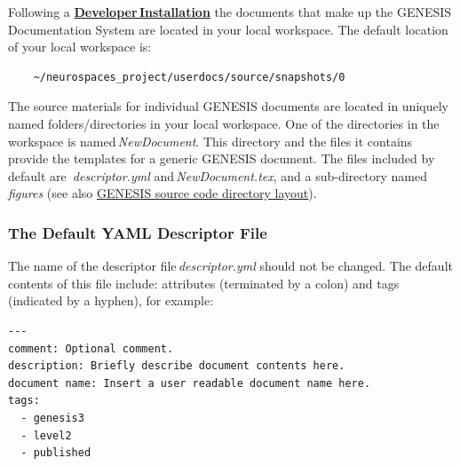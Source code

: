 \documentclass[12pt]{article}
\begin{document}
Following a \href{../genesis-installation/genesis-installation.tex}{\bf Developer\,Installation} the documents that make up the GENESIS Documentation System are located in your local workspace. The default location of your local workspace is:
\begin{verbatim}
    ~/neurospaces_project/userdocs/source/snapshots/0
\end{verbatim}
The source materials for individual GENESIS documents are located in
uniquely named folders/directories in your local workspace. One of the
directories in the workspace is named\,{\it NewDocument}. This
directory and the files it contains provide the templates for a
generic GENESIS document. The files included by default are\,{\it
  descriptor.yml} and\,{\it NewDocument.tex}, and a sub-directory
named\,{\it figures} (see also
\href{../developer-sources-of-components/developer-sources-of-components.tex}{GENESIS
  source code directory layout}).

\subsubsection*{The Default YAML Descriptor File}

The name of the descriptor file\,{\it descriptor.yml} should not be changed. The default contents of this file include: attributes (terminated by a colon) and tags (indicated by a hyphen), for example:

\begin{verbatim}
---
comment: Optional comment.
description: Briefly describe document contents here. 
document name: Insert a user readable document name here.
tags:
  - genesis3
  - level2
  - published
\end{verbatim}
\end{document}
